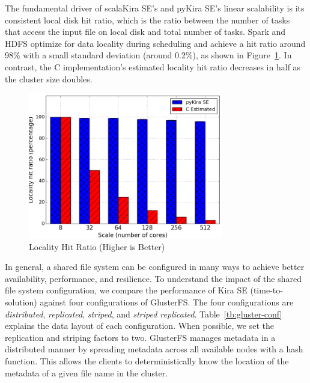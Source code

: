 \documentclass[10pt,journal,compsoc]{IEEEtran}
\begin{document}
The fundamental driver of scalaKira SE's and pyKira SE's linear scalability is its consistent local disk
hit ratio, which is the ratio between the number of tasks that access the input file 
on local disk and total number of tasks. Spark and HDFS optimize for data locality during scheduling and achieve a
hit ratio around 98\% with a small standard deviation (around 0.2\%), as shown in Figure~\ref{fig:locality}. 
In contrast, the C implementation's estimated locality hit ratio decreases in half as the cluster size doubles.

\begin{figure}[h]
	\begin{center}
		\includegraphics[width=85mm]{pictures/locality}
		\caption{Locality Hit Ratio (Higher is Better)
		\label{fig:locality}}
  	\end{center}
\end{figure}

In general, a shared file system can be configured in many ways to achieve better
availability, performance, and resilience. To understand the impact of the shared
file system configuration, we compare the performance of Kira SE (time-to-solution)
against four configurations of GlusterFS. The four configurations are
\emph{distributed}, \emph{replicated}, \emph{striped}, and \emph{striped replicated}. 
Table~\ref{tb:gluster-conf} explains the data layout of each configuration.
When possible, we set the replication and striping factors to two.
GlusterFS manages metadata in a distributed manner by spreading metadata across
all available nodes with a hash function. This allows the clients to deterministically
know the location of the metadata of a given file name in the cluster.
\end{document}
